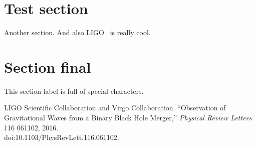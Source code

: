\documentclass[12pt]{article}
\begin{document}
\section{Test section}
\label{sec:testref}

Another section.  And also LIGO~\cite{Ligo2016} is really cool.

\section{Section final}
\label{sec:ref^th_sp-e:c[ial+charsz?x/xa;.=x}

This section label is full of special characters.


\begin{thebibliography}{99}
 {LIGO Scientific Collaboration and Virgo
    Collaboration.}  ``Observation of Gravitational Waves from a Binary Black
  Hole Merger,'' \emph{Physical Review Letters} {116} {061102}, {2016}.
  \\
  doi:{10.1103/PhysRevLett.116.061102}.
\end{thebibliography}
\end{document}
